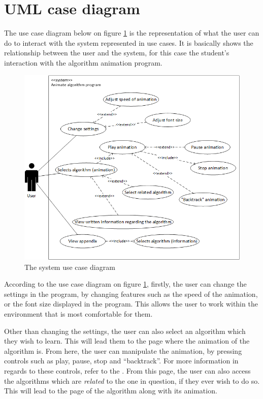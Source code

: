 \newpage

\section{UML case diagram}
The use case diagram below on figure \ref{useCaseDiagram} is the representation of what the user can do to interact with the system represented in use cases. It is basically shows the relationship between the user and the system, for this case the student's interaction with the algorithm animation program.

\begin{figure}[H]
\centering
\hspace*{-1cm}
\includegraphics[scale=1]{images/report_images/useCaseDiagram.png}
\caption{The system use case diagram}
\label{useCaseDiagram}
\end{figure}

According to the use case diagram on figure \ref{useCaseDiagram}, firstly, the user can change the settings in the program, by changing features such as the speed of the animation, or the font size displayed in the program. This allows the user to work within the environment that is most comfortable for them. 

Other than changing the settings, the user can also select an algorithm which they wish to learn. This will lead them to the page where the animation of the algorithm is. From here, the user can manipulate the animation, by pressing controls such as play, pause, stop and ``backtrack''. For more information in regards to these controls, refer to the . From this page, the user can also access the algorithms which are \textit{related} to the one in question, if they ever wish to do so. This will lead to the page of the algorithm along with its animation.

